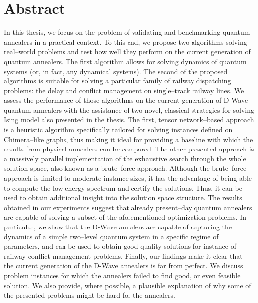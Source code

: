 \chapter{Abstract}

In this thesis, we focus on the problem of validating and benchmarking quantum annealers in a
practical context. To this end, we propose two algorithms solving real--world problems and test how
well they perform on the current generation of quantum annealers. The first algorithm allows for
solving dynamics of quantum systems (or, in fact, any dynamical systems). The second of the proposed
algorithms is suitable for solving a particular family of railway dispatching problems: the delay
and conflict management on single--track railway lines. We assess the performance of those
algorithms on the current generation of D-Wave quantum annealers with the assistance of two novel,
classical strategies for solving Ising model also presented in the thesis. The first, tensor
network--based approach is a heuristic algorithm specifically tailored for solving instances defined
on Chimera--like graphs, thus making it ideal for providing a baseline with which the results from
physical annealers can be compared. The other presented approach is a massively parallel
implementation of the exhaustive search through the whole solution space, also known as a
brute--force approach. Although the brute--force approach is limited to moderate instance sizes, it
has the advantage of being able to compute the low energy spectrum and certify the solutions. Thus,
it can be used to obtain additional insight into the solution space structure. The results obtained
in our experiments suggest that already present--day quantum annealers are capable of solving a
subset of the aforementioned optimization problems. In particular, we show that the D-Wave annalers
are capable of capturing the dynamics of a simple two--level quantum system in a specific regime of
parameters, and can be used to obtain good quality solutions for instance of railway conflict
management problems. Finally, our findings make it clear that the current generation of the D-Wave
annealers is far from perfect. We discuss problem instances for which the annealers failed to find
good, or even feasible solution. We also provide, where possible, a plausible explanation of why
some of the presented problems might be hard for the annealers.
